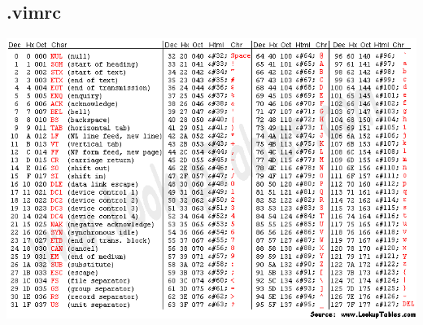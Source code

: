 \documentclass[a4paper]{article}
\begin{document}
\begin{multicols*}{2}
    \subsection{.vimrc}
        
    \includegraphics[width=\linewidth]{../other/asciifull.png}

\end{multicols*}
\end{document}
